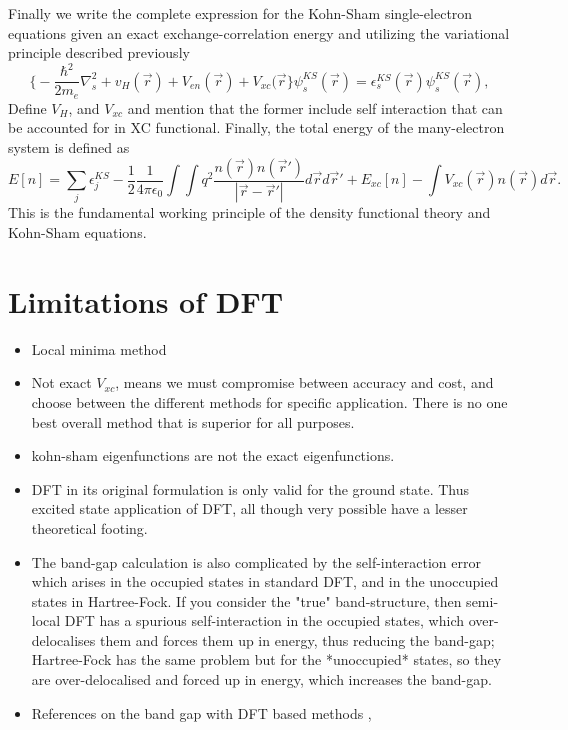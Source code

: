 Finally we write the complete expression for the Kohn-Sham single-electron equations given an exact exchange-correlation energy and utilizing the variational principle described previously
\begin{equation}
    \bigg\{ -\frac{\hbar^2}{2m_e}\nabla^2_s + v_H(\vec{r}) + V_{en}(\vec{r}) + V_{xc}(\vec{r} \bigg\}\psi_s^{KS}(\vec{r}) = \epsilon_s^{KS}(\vec{r})\psi_s^{KS}(\vec{r}),
\end{equation}
Define $V_H$, and $V_{xc}$ and mention that the former include self interaction that can be accounted for in XC functional. Finally, the total energy of the many-electron system is defined as
\begin{equation}
    E[n] = \sum_j \epsilon_j^{KS} - \frac{1}{2}\frac{1}{4\pi\epsilon_0} \int \int q^2 \frac{n(\vec{r})n(\vec{r}')}{|\vec{r} - \vec{r}'|}d\vec{r}d\vec{r}' + E_{xc}[n] - \int V_{xc}(\vec{r})n(\vec{r})d\vec{r}.
\end{equation}
This is the fundamental working principle of the density functional theory and Kohn-Sham equations.

\section{Limitations of DFT}
\begin{itemize}
    \item Local minima method
    \item Not exact $V_{xc}$, means we must compromise between accuracy and cost, and choose between the different methods for specific application. There is no one best overall method that is superior for all purposes. 
    \item kohn-sham eigenfunctions are not the exact eigenfunctions. 
    \item DFT in its original formulation is only valid for the ground state. Thus excited state application of DFT, all though very possible have a lesser theoretical footing.
    \item The band-gap calculation is also complicated by the self-interaction error which arises in the occupied states in standard DFT, and in the unoccupied states in Hartree-Fock. If you consider the "true" band-structure, then semi-local DFT has a spurious self-interaction in the occupied states, which over-delocalises them and forces them up in energy, thus reducing the band-gap; Hartree-Fock has the same problem but for the *unoccupied* states, so they are over-delocalised and forced up in energy, which increases the band-gap. \cite{bandgap_dft_forum}
    \item References on the band gap with DFT based methods \cite{bandgap_dft_1}, \cite{bandgap_dft_2}
\end{itemize}

